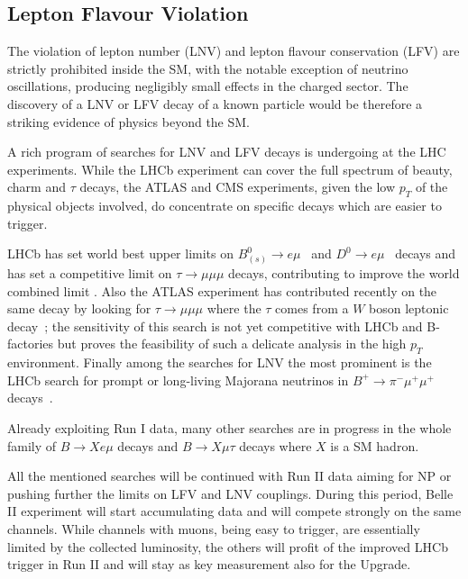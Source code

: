 \subsection{Lepton Flavour Violation}

The violation of lepton number (LNV) and lepton flavour conservation (LFV) are strictly prohibited
inside the SM, with the notable exception of neutrino oscillations, producing negligibly 
small effects in the charged sector. 
The discovery of a LNV or LFV decay of a known particle would be therefore a striking evidence 
of physics beyond the SM. 

A rich program of searches for LNV and LFV decays is undergoing at the LHC experiments. 
While the LHCb experiment can cover the full spectrum of beauty, charm and $\tau$ decays, 
the ATLAS and CMS experiments, given the low $p_T$ of the physical objects involved, do concentrate on specific decays which are easier to trigger. 

LHCb has set world best upper limits on $B^0_{(s)} \to e \mu$~\cite{Aaij:2013cby} 
and $D^0 \to e \mu$~\cite{Aaij:2015qmj} decays and has set a competitive
limit on $\tau \to \mu\mu\mu$ decays, contributing to improve the world combined limit \cite{Aaij:2014azz}. 
Also the ATLAS experiment has contributed recently on the same decay by looking for $\tau \to \mu\mu\mu$
where the $\tau$ comes from a $W$ boson leptonic decay~\cite{Aad:2016wce}; the sensitivity of this search is not yet 
competitive with LHCb and B-factories but proves the feasibility of such a delicate analysis in the high $p_T$ 
environment. 
Finally among the searches for LNV the most prominent is the LHCb search for prompt or long-living Majorana neutrinos 
in $B^+\to \pi^- \mu^+ \mu^+$ decays~\cite{Aaij:2012zr}.

Already exploiting Run I data, many other searches are in progress in the whole family of $B\to X e\mu$ decays and 
$B\to X \mu\tau$ decays where $X$ is a SM hadron. 

All the mentioned searches will be continued with Run II data aiming for NP or pushing further the limits on 
LFV and LNV couplings. 
During this period, Belle II experiment will start accumulating data and will compete strongly on the same channels. 
While channels with muons, being easy to trigger, are essentially limited by the collected luminosity, the others will
profit of the improved LHCb trigger in Run II and will stay as key measurement also for the Upgrade. 


